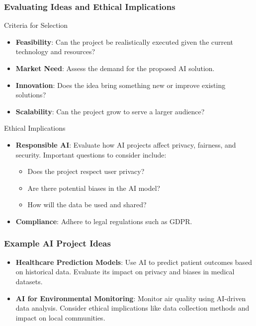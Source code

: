 \documentclass[aspectratio=169]{beamer}
\begin{document}
\begin{frame}[fragile]
    \frametitle{Evaluating Ideas and Ethical Implications}
    \begin{block}{Criteria for Selection}
        \begin{itemize}
            \item \textbf{Feasibility}: Can the project be realistically executed given the current technology and resources?
            \item \textbf{Market Need}: Assess the demand for the proposed AI solution.
            \item \textbf{Innovation}: Does the idea bring something new or improve existing solutions?
            \item \textbf{Scalability}: Can the project grow to serve a larger audience?
        \end{itemize}
    \end{block}
    
    \begin{block}{Ethical Implications}
        \begin{itemize}
            \item \textbf{Responsible AI}: Evaluate how AI projects affect privacy, fairness, and security. Important questions to consider include:
            \begin{itemize}
                \item Does the project respect user privacy?
                \item Are there potential biases in the AI model?
                \item How will the data be used and shared?
            \end{itemize}
            \item \textbf{Compliance}: Adhere to legal regulations such as GDPR.
        \end{itemize}
    \end{block}
\end{frame}

\begin{frame}[fragile]
    \frametitle{Example AI Project Ideas}
    \begin{itemize}
        \item \textbf{Healthcare Prediction Models}: 
        Use AI to predict patient outcomes based on historical data. 
        Evaluate its impact on privacy and biases in medical datasets.
        
        \item \textbf{AI for Environmental Monitoring}: 
        Monitor air quality using AI-driven data analysis. 
        Consider ethical implications like data collection methods and impact on local communities.
    \end{itemize}
\end{frame}
\end{document}
